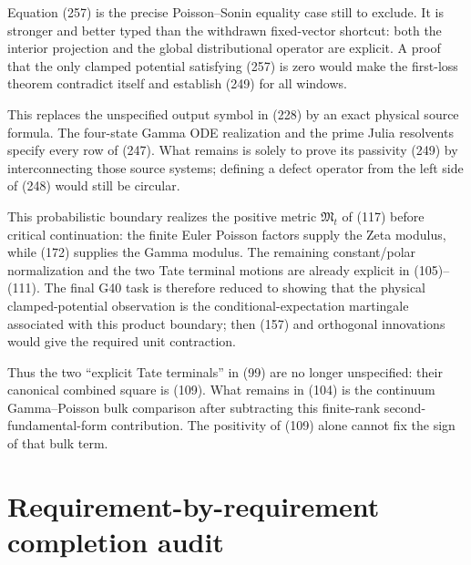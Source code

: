 \documentclass[11pt]{article}
\begin{document}
Equation (257) is the precise Poisson--Sonin equality case still to exclude.
It is stronger and better typed than the withdrawn fixed-vector shortcut:
both the interior projection and the global distributional operator are
explicit.  A proof that the only clamped potential satisfying (257) is zero
would make the first-loss theorem contradict itself and establish (249) for
all windows.

This replaces the unspecified output symbol in (228) by an exact physical
source formula.  The four-state Gamma ODE realization and the prime Julia
resolvents specify every row of (247).  What remains is solely to prove its
passivity (249) by interconnecting those source systems; defining a defect
operator from the left side of (248) would still be circular.

This probabilistic boundary realizes the positive metric
$\mathfrak M_t$ of (117) before critical continuation: the finite Euler
Poisson factors supply the Zeta modulus, while (172) supplies the Gamma
modulus.  The remaining constant/polar normalization and the two Tate
terminal motions are already explicit in (105)--(111).  The final G40 task
is therefore reduced to showing that the physical clamped-potential
observation is the conditional-expectation martingale associated with this
product boundary; then (157) and orthogonal innovations would give the
required unit contraction.

Thus the two ``explicit Tate terminals'' in (99) are no longer unspecified:
their canonical combined square is (109).  What remains in (104) is the
continuum Gamma--Poisson bulk comparison after subtracting this finite-rank
second-fundamental-form contribution.  The positivity of (109) alone cannot
fix the sign of that bulk term.

\section{Requirement-by-requirement completion audit}
\end{document}
